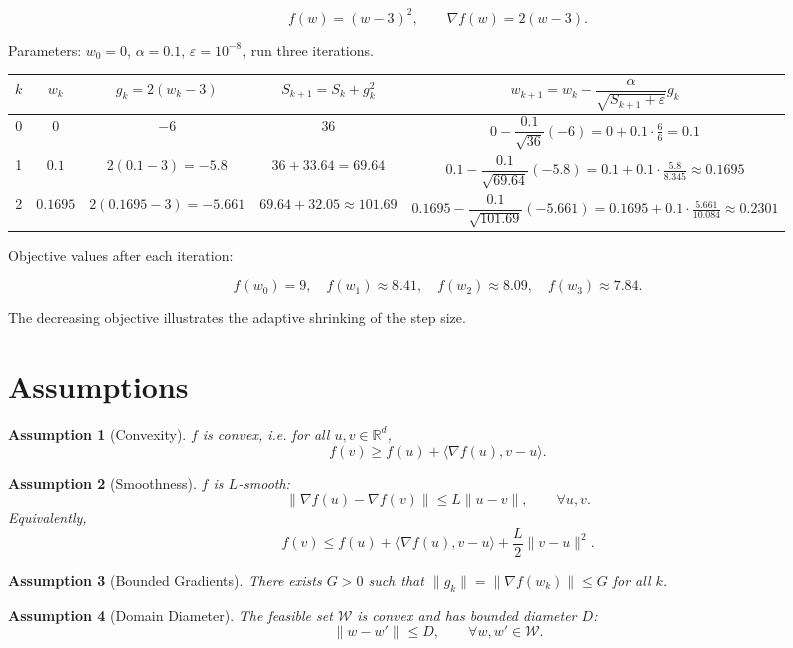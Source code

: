 \documentclass{article}
\newtheorem{assumption}{Assumption}
\begin{document}
\[
f(w)=(w-3)^{2},\qquad \nabla f(w)=2(w-3).
\]

Parameters: $w_{0}=0$, $\alpha=0.1$, $\varepsilon=10^{-8}$, run three iterations.

\begin{center}
\begin{tabular}{c|c|c|c|c}
$k$ & $w_{k}$ & $g_{k}=2(w_{k}-3)$ & $S_{k+1}=S_{k}+g_{k}^{2}$ & $w_{k+1}=w_{k}-\dfrac{\alpha}{\sqrt{S_{k+1}+\varepsilon}}g_{k}$\\ \hline
0 & $0$ & $-6$ & $36$ & $0-\dfrac{0.1}{\sqrt{36}}(-6)=0+0.1\cdot\frac{6}{6}=0.1$\\[4pt]
1 & $0.1$ & $2(0.1-3)=-5.8$ & $36+33.64=69.64$ & $0.1-\dfrac{0.1}{\sqrt{69.64}}(-5.8)
        =0.1+0.1\cdot\frac{5.8}{8.345}\approx0.1695$\\[4pt]
2 & $0.1695$ & $2(0.1695-3)=-5.661$ & $69.64+32.05\approx101.69$ &
   $0.1695-\dfrac{0.1}{\sqrt{101.69}}(-5.661)
        =0.1695+0.1\cdot\frac{5.661}{10.084}\approx0.2301$
\end{tabular}
\end{center}

Objective values after each iteration:

\[
f(w_{0})=9,\quad f(w_{1})\approx8.41,\quad f(w_{2})\approx8.09,\quad f(w_{3})\approx7.84.
\]

The decreasing objective illustrates the adaptive shrinking of the step size.

\newpage
\section*{Assumptions}
\begin{assumption}[Convexity]\label{ass:convex}
$f$ is convex, i.e. for all $u,v\in\mathbb{R}^{d}$,
\[
f(v)\ge f(u)+\langle\nabla f(u),v-u\rangle .
\]
\end{assumption}

\begin{assumption}[Smoothness]\label{ass:smooth}
$f$ is $L$‑smooth:
\[
\|\nabla f(u)-\nabla f(v)\| \le L\|u-v\|,\qquad\forall u,v.
\]
Equivalently,
\[
f(v)\le f(u)+\langle\nabla f(u),v-u\rangle+\frac{L}{2}\|v-u\|^{2}.
\]
\end{assumption}

\begin{assumption}[Bounded Gradients]\label{ass:bounded}
There exists $G>0$ such that $\|g_{k}\|=\|\nabla f(w_{k})\|\le G$ for all $k$.
\end{assumption}

\begin{assumption}[Domain Diameter]\label{ass:diameter}
The feasible set $\mathcal{W}$ is convex and has bounded diameter $D$:
\[
\|w-w'\|\le D,\qquad\forall w,w'\in\mathcal{W}.
\]
\end{assumption}
\end{document}
